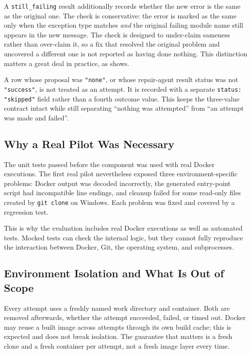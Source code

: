 A \texttt{still\_failing} result additionally records whether the new
error is the same as the original one. The check is conservative: the
error is marked as the same only when the exception type matches
\emph{and} the original failing module name still appears in the new
message. The check is designed to under-claim sameness rather than
over-claim it, so a fix that resolved the original problem and uncovered
a different one is not reported as having done nothing. This distinction
matters a great deal in practice, as  shows.

\begin{sloppypar}
A row whose proposal was \texttt{"none"}, or whose repair-agent result status
was not \texttt{"success"}, is not treated as an attempt. It is recorded with a
separate \texttt{status: "skipped"} field rather than a fourth outcome
value. This keeps the three-value contract intact while still separating
``nothing was attempted'' from ``an attempt was made and failed''.
\end{sloppypar}

\subsection{Why a Real Pilot Was Necessary}
\label{sec:m-fixapply-bugs}

The unit tests passed before the component was used with real Docker executions.
The first real pilot nevertheless exposed three environment-specific problems:
Docker output was decoded incorrectly, the generated entry-point script had
incompatible line endings, and cleanup failed for some read-only files created
by \texttt{git clone} on Windows. Each problem was fixed and covered by a
regression test.

This is why the evaluation includes real Docker executions as well as automated
tests. Mocked tests can check the internal logic, but they cannot fully reproduce
the interaction between Docker, Git, the operating system, and subprocesses.


\subsection{Environment Isolation and What Is Out of Scope}

Every attempt uses a freshly named work directory and container. Both are
removed afterwards, whether the attempt succeeded, failed, or timed out.
Docker may reuse a built image across attempts through its own build
cache; this is expected and does not break isolation. The guarantee that
matters is a fresh clone and a fresh container per attempt, not a fresh
image layer every time.

